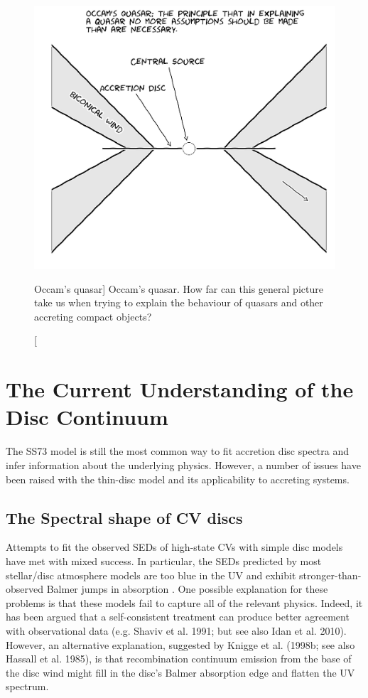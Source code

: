 \begin{figure}
\centering
\includegraphics[width=1.0\textwidth]{figures/01-intro/occam.jpg}
\caption
[Occam's quasar]
{
Occam's quasar. How far can this general picture take us when trying to explain
the behaviour of quasars and other accreting compact objects?
} 
\label{fig:occam}
\end{figure}


\section{The Current Understanding of the Disc Continuum}

\label{sec:disc_continuum}

The SS73 model is still the most common way to fit accretion disc spectra and infer
information about the underlying physics. However, 
a number of issues have been raised with the thin-disc model and
its applicability to accreting systems. 

\subsection{The Spectral shape of CV discs}


Attempts to fit the observed SEDs of high-state CVs with simple disc models 
have met with mixed success. In
particular, the SEDs predicted by most stellar/disc atmosphere models 
are too blue in the UV \citep{wade1988,long1991,long1994,knigge1998} and exhibit
stronger-than-observed Balmer jumps in absorption 
\citep{wade1984,haug1987,ladous1989b,knigge1998}. One possible
explanation for these problems is that these models fail to capture
all of the relevant physics. Indeed, it has been argued that a
self-consistent treatment can produce better agreement with 
observational data (e.g. Shaviv et al. 1991;  but see also Idan et al. 2010).
\nocite{idanshaviv2010} \nocite{shaviv1991}
However, an alternative explanation, suggested by Knigge et al.
(1998b; see also Hassall et al. 1985)\nocite{KLWB98,hassall}, 
is that recombination continuum emission from the base of the 
disc wind might fill in the disc's Balmer absorption edge and flatten 
the UV spectrum.

